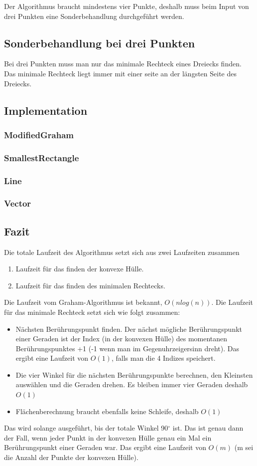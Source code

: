 \documentclass[10pt]{article}
\begin{document}
Der Algorithmus braucht mindestens vier Punkte, deshalb muss beim Input von drei Punkten eine Sonderbehandlung durchgeführt werden.

\subsection{Sonderbehandlung bei drei Punkten}
Bei drei Punkten muss man nur das minimale Rechteck eines Dreiecks finden. Das minimale Rechteck liegt immer mit einer seite an der längsten Seite des Dreiecks.

\subsection{Implementation}
\subsubsection{ModifiedGraham}
\subsubsection{SmallestRectangle}
\subsubsection{Line}
\subsubsection{Vector}

\subsection{Fazit}
Die totale Laufzeit des Algorithmus setzt sich aus zwei Laufzeiten zusammen
\begin{enumerate}
 \item Laufzeit für das finden der konvexe Hülle.
 \item Laufzeit für das finden des minimalen Rechtecks.
\end{enumerate}
Die Laufzeit vom Graham-Algorithmus ist bekannt, $O(n log(n))$. Die Laufzeit für das minimale Rechteck setzt sich wie folgt zusammen:
\begin{itemize}
 \item Nächsten Berührungspunkt finden. Der nächst mögliche Berührungspunkt einer Geraden ist der Index (in der konvexen Hülle) des momentanen Berührungspunktes +1 (-1 wenn man im Gegenuhrzeigersinn dreht). Das ergibt eine Laufzeit von $O(1)$, falls man die 4 Indizes speichert.
 \item Die vier Winkel für die nächsten Berührungspunkte berechnen, den Kleinsten auswählen und die Geraden drehen. Es bleiben immer vier Geraden deshalb $O(1)$
 \item Flächenberechnung braucht ebenfalls keine Schleife, deshalb $O(1)$
\end{itemize}
Das wird solange ausgeführt, bis der totale Winkel 90$^\circ$ ist. Das ist genau dann der Fall, wenn jeder Punkt in der konvexen Hülle genau ein Mal ein Berührungspunkt einer Geraden war. Das ergibt eine Laufzeit von $O(m)$ (m sei die Anzahl der Punkte der konvexen Hülle).
\end{document}
